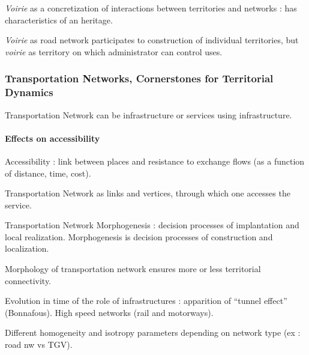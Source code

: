 \textit{Voirie} as a concretization of interactions between territories and networks : has characteristics of an heritage.

\textit{Voirie} as road network participates to construction of individual territories, but \textit{voirie} as territory on which administrator can control uses.


\subsubsection*{Transportation Networks, Cornerstones for Territorial Dynamics}

Transportation Network can be infrastructure or services using infrastructure.

\paragraph{Effects on accessibility}

Accessibility : link between places and resistance to exchange flows (as a function of distance, time, cost).

Transportation Network as links and vertices, through which one accesses the service.

Transportation Network Morphogenesis : decision processes of implantation and local realization. Morphogenesis is decision processes of construction and localization.

Morphology of transportation network ensures more or less territorial connectivity.

Evolution in time of the role of infrastructures : apparition of ``tunnel effect'' (Bonnafous). High speed networks (rail and motorways).

Different homogeneity and isotropy parameters depending on network type (ex : road nw vs TGV). 








